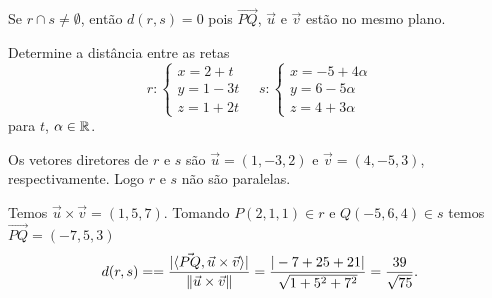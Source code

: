 Se $r \cap s \ne \emptyset$, então $d(r,s) = 0$ pois $\vec{PQ}$, $\vec{u}$ e $\vec{v}$ estão no mesmo plano.

\begin{exemplo}
    Determine a distância entre as retas
    \[
        r: \begin{cases}
            x = 2 + t  \\
            y = 1 - 3t \\
            z = 1 + 2t
        \end{cases} \quad s: \begin{cases}
            x = -5 + 4\alpha \\
            y = 6 - 5\alpha  \\
            z = 4 + 3\alpha
        \end{cases}
    \]
    para $t$, $\alpha \in \mathbb{R}$.
    \begin{solucao}
        Os vetores diretores de $r$ e $s$ são $\vec{u} = (1,-3,2)$ e $\vec{v} = (4,-5,3)$, respectivamente. Logo $r$ e $s$ não são paralelas.

        Temos $\vec{u}\times\vec{v} = (1,5,7)$. Tomando $P(2,1,1) \in r$ e $Q(-5,6,4) \in s$ temos $\vec{PQ} = (-7,5,3)$
        \[
            d(r,s) = = \dfrac{|\langle\vec{PQ},\vec{u}\times\vec{v}\rangle|}{\left\Vert{\vec{u}\times\vec{v}}\right\Vert} = \dfrac{|-7+25+21|}{\sqrt{1 + 5^2 + 7^2}} = \dfrac{39}{\sqrt{75}}.
        \]

    \end{solucao}
\end{exemplo}
